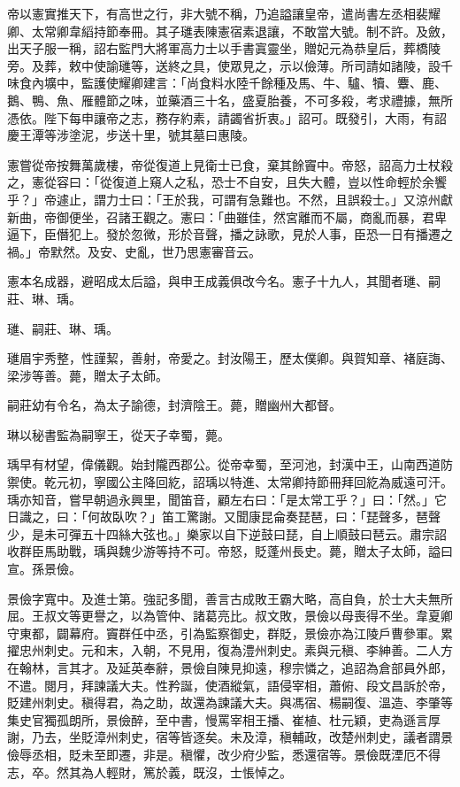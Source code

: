 \begin{pinyinscope}
 帝以憲實推天下，有高世之行，非大號不稱，乃追謚讓皇帝，遣尚書左丞相裴耀卿、太常卿韋縚持節奉冊。其子璡表陳憲宿素退讓，不敢當大號。制不許。及斂，出天子服一稱，詔右監門大將軍高力士以手書寘靈坐，贈妃元為恭皇后，葬橋陵旁。及葬，敕中使諭璡等，送終之具，使眾見之，示以儉薄。所司請如諸陵，設千味食內壙中，監護使耀卿建言：「尚食料水陸千餘種及馬、牛、驢、犢、麞、鹿、鵝、鴨、魚、雁體節之味，並藥酒三十名，盛夏胎養，不可多殺，考求禮據，無所憑依。陛下每申讓帝之志，務存約素，請蠲省折衷。」詔可。既發引，大雨，有詔慶王潭等涉塗泥，步送十里，號其墓曰惠陵。



 憲嘗從帝按舞萬歲樓，帝從復道上見衛士已食，棄其餘竇中。帝怒，詔高力士杖殺之，憲從容曰：「從復道上窺人之私，恐士不自安，且失大體，豈以性命輕於余饗乎？」帝遽止，謂力士曰：「王於我，可謂有急難也。不然，且誤殺士。」又涼州獻新曲，帝御便坐，召諸王觀之。憲曰：「曲雖佳，然宮離而不屬，商亂而暴，君卑逼下，臣僭犯上。發於忽微，形於音聲，播之詠歌，見於人事，臣恐一日有播遷之禍。」帝默然。及安、史亂，世乃思憲審音云。



 憲本名成器，避昭成太后謚，與申王成義俱改今名。憲子十九人，其聞者璡、嗣莊、琳、瑀。



 璡、嗣莊、琳、瑀。



 璡眉宇秀整，性謹絜，善射，帝愛之。封汝陽王，歷太僕卿。與賀知章、褚庭誨、梁涉等善。薨，贈太子太師。



 嗣莊幼有令名，為太子諭德，封濟陰王。薨，贈幽州大都督。



 琳以秘書監為嗣寧王，從天子幸蜀，薨。



 瑀早有材望，偉儀觀。始封隴西郡公。從帝幸蜀，至河池，封漢中王，山南西道防禦使。乾元初，寧國公主降回紇，詔瑀以特進、太常卿持節冊拜回紇為威遠可汗。瑀亦知音，嘗早朝過永興里，聞笛音，顧左右曰：「是太常工乎？」曰：「然。」它日識之，曰：「何故臥吹？」笛工驚謝。又聞康昆侖奏琵琶，曰：「琵聲多，琶聲少，是未可彈五十四絲大弦也。」樂家以自下逆鼓曰琵，自上順鼓曰琶云。肅宗詔收群臣馬助戰，瑀與魏少游等持不可。帝怒，貶蓬州長史。薨，贈太子太師，謚曰宣。孫景儉。



 景儉字寬中。及進士第。強記多聞，善言古成敗王霸大略，高自負，於士大夫無所屈。王叔文等更譽之，以為管仲、諸葛亮比。叔文敗，景儉以母喪得不坐。韋夏卿守東都，闢幕府。竇群任中丞，引為監察御史，群貶，景儉亦為江陵戶曹參軍。累擢忠州刺史。元和末，入朝，不見用，復為澧州刺史。素與元稹、李紳善。二人方在翰林，言其才。及延英奉辭，景儉自陳見抑遠，穆宗憐之，追詔為倉部員外郎，不遣。閱月，拜諫議大夫。性矜誕，使酒縱氣，語侵宰相，蕭俯、段文昌訴於帝，貶建州刺史。稹得君，為之助，故還為諫議大夫。與馮宿、楊嗣復、溫造、李肇等集史官獨孤朗所，景儉醉，至中書，慢罵宰相王播、崔植、杜元穎，吏為遜言厚謝，乃去，坐貶漳州刺史，宿等皆逐矣。未及漳，稹輔政，改楚州刺史，議者謂景儉辱丞相，貶未至即遷，非是。稹懼，改少府少監，悉還宿等。景儉既湮厄不得志，卒。然其為人輕財，篤於義，既沒，士悵悼之。




\end{pinyinscope}
